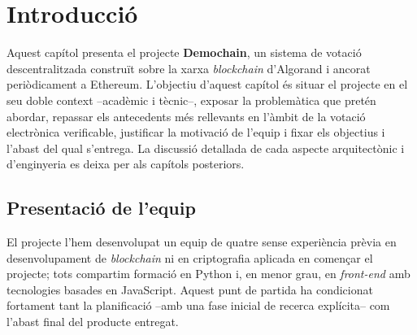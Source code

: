 

\chapter{Introducció}
\label{ch:introduccio}

Aquest capítol presenta el projecte \textbf{Demochain}, un sistema de votació descentralitzada construït sobre la xarxa
\emph{blockchain} d'Algorand i ancorat periòdicament a Ethereum.
L'objectiu d'aquest capítol és situar el projecte en el seu doble context --acadèmic i tècnic--, exposar la problemàtica
que pretén abordar, repassar els antecedents més rellevants en l'àmbit de la votació electrònica verificable, justificar
la motivació de l'equip i fixar els objectius i l'abast del qual s'entrega.
La discussió detallada de cada aspecte arquitectònic i d'enginyeria es deixa per als capítols posteriors.



\section{Presentació de l'equip}
\label{sec:equip}

El projecte l'hem desenvolupat un equip de quatre sense experiència prèvia en desenvolupament de \emph{blockchain} ni en
criptografia aplicada en començar el projecte; tots compartim formació en Python i, en menor grau, en \textit{front-end}
amb tecnologies basades en JavaScript.
Aquest punt de partida ha condicionat fortament tant la planificació --amb una fase inicial de recerca explícita-- com
l'abast final del producte entregat.

